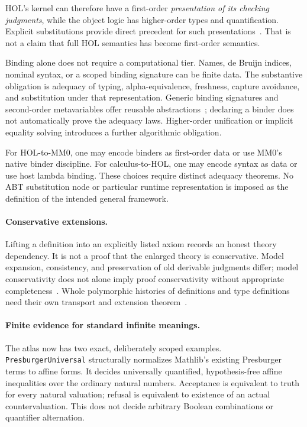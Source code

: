 \documentclass[11pt]{article}
\newcommand{\code}[1]{\nolinkurl{#1}}
\begin{document}
HOL's kernel can therefore have a first-order \emph{presentation of its
checking judgments}, while the object logic has higher-order types and
quantification. Explicit substitutions provide direct precedent for such
presentations~\cite{holls}. That is not a claim that full HOL semantics
has become first-order semantics.

Binding alone does not require a computational tier. Names, de Bruijn
indices, nominal syntax, or a scoped binding signature can be finite data.
The substantive obligation is adequacy of typing, alpha-equivalence,
freshness, capture avoidance, and substitution under that representation.
Generic binding signatures and second-order metavariables offer reusable
abstractions~\cite{fpt,fiore2022}; declaring a binder does not automatically
prove the adequacy laws. Higher-order unification or implicit equality
solving introduces a further algorithmic obligation.

For HOL-to-MM0, one may encode binders as first-order data or use MM0's
native binder discipline. For calculus-to-HOL, one may encode syntax as
data or use host lambda binding. These choices require distinct adequacy
theorems. No ABT substitution node or particular runtime representation
is imposed as the definition of the intended general framework.

\paragraph{Conservative extensions.}
Lifting a definition into an explicitly listed axiom records an honest
theory dependency. It is not a proof that the enlarged theory is
conservative. Model expansion, consistency, and preservation of old
derivable judgments differ; model conservativity does not alone imply
proof conservativity without appropriate completeness~\cite{arthan}.
Whole polymorphic histories of definitions and type definitions need
their own transport and extension theorem~\cite{kumar}.

\paragraph{Finite evidence for standard infinite meanings.}
The atlas now has two exact, deliberately scoped examples.
\code{PresburgerUniversal} structurally normalizes Mathlib's existing
Presburger terms to affine forms. It decides universally quantified,
hypothesis-free affine inequalities over the ordinary natural numbers.
Acceptance is equivalent to truth for every natural valuation; refusal is
equivalent to existence of an actual countervaluation. This does not decide
arbitrary Boolean combinations or quantifier alternation.
\end{document}
